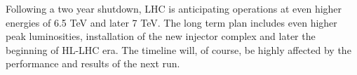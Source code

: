 Following a two year shutdown, LHC is anticipating operations at even higher energies of 6.5 TeV and later 7 TeV. The long term plan includes even higher peak luminosities, installation of the new injector complex and later the beginning of HL-LHC era. The timeline will, of course, be highly affected by the performance and results of the next run.